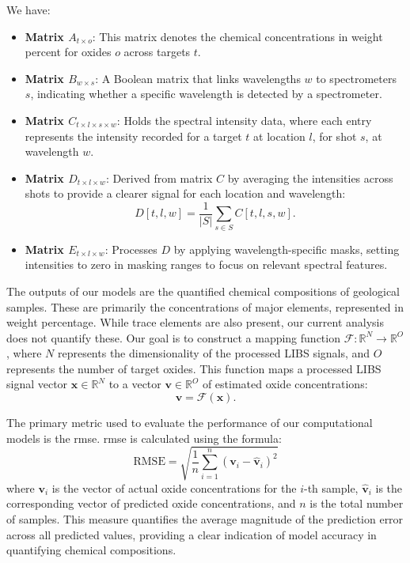 We have:

\begin{itemize}
    \item \textbf{Matrix $A_{t \times o}$}: This matrix denotes the chemical concentrations in weight percent for oxides $o$ across targets $t$.
    \item \textbf{Matrix $B_{w \times s}$}: A Boolean matrix that links wavelengths $w$ to spectrometers $s$, indicating whether a specific wavelength is detected by a spectrometer.
    \item \textbf{Matrix $C_{t \times l \times s \times w}$}: Holds the spectral intensity data, where each entry represents the intensity recorded for a target $t$ at location $l$, for shot $s$, at wavelength $w$.
    \item \textbf{Matrix $D_{t \times l \times w}$}: Derived from matrix $C$ by averaging the intensities across shots to provide a clearer signal for each location and wavelength:
    \[
    D[t, l, w] = \frac{1}{|S|} \sum_{s \in S} C[t, l, s, w].
    \]
    \item \textbf{Matrix $E_{t \times l \times w}$}: Processes $D$ by applying wavelength-specific masks, setting intensities to zero in masking ranges to focus on relevant spectral features.
\end{itemize}

The outputs of our models are the quantified chemical compositions of geological samples. These are primarily the concentrations of major elements, represented in weight percentage. While trace elements are also present, our current analysis does not quantify these.
Our goal is to construct a mapping function $\mathcal{F} : \mathbb{R}^N \rightarrow \mathbb{R}^O$, where $N$ represents the dimensionality of the processed LIBS signals, and $O$ represents the number of target oxides. This function maps a processed LIBS signal vector $\mathbf{x} \in \mathbb{R}^N$ to a vector $\mathbf{v} \in \mathbb{R}^O$ of estimated oxide concentrations:
\[
\mathbf{v} = \mathcal{F}(\mathbf{x}).
\]

The primary metric used to evaluate the performance of our computational models is the \gls{rmse}. \gls{rmse} is calculated using the formula:
\[
\text{RMSE} = \sqrt{\frac{1}{n} \sum_{i=1}^{n} (\mathbf{v}_i - \hat{\mathbf{v}}_i)^2}
\]
where \( \mathbf{v}_i \) is the vector of actual oxide concentrations for the \( i \)-th sample, \( \hat{\mathbf{v}}_i \) is the corresponding vector of predicted oxide concentrations, and \( n \) is the total number of samples. This measure quantifies the average magnitude of the prediction error across all predicted values, providing a clear indication of model accuracy in quantifying chemical compositions.

